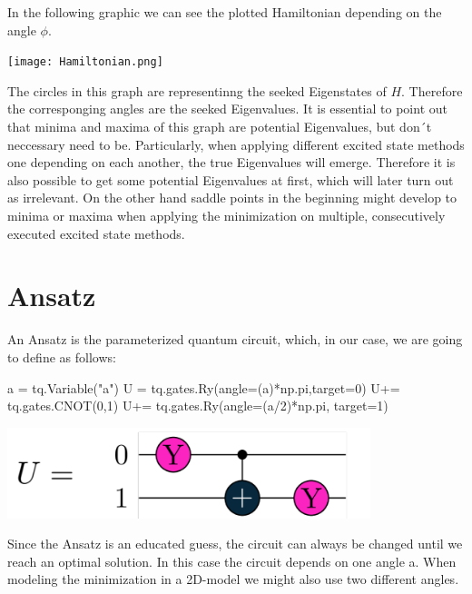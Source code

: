 \documentclass[
  letterpaper,
  DIV=11,
  numbers=noendperiod]{scrartcl}
\newenvironment{Shaded}{\begin{snugshade}}{\end{snugshade}}
\newcommand{\DecValTok}[1]{\textcolor[rgb]{0.68,0.00,0.00}{#1}}
\newcommand{\NormalTok}[1]{\textcolor[rgb]{0.00,0.23,0.31}{#1}}
\newcommand{\OperatorTok}[1]{\textcolor[rgb]{0.37,0.37,0.37}{#1}}
\newcommand{\StringTok}[1]{\textcolor[rgb]{0.13,0.47,0.30}{#1}}
\begin{document}
In the following graphic we can see the plotted Hamiltonian depending on
the angle \(\phi\).

\texttt{[image: Hamiltonian.png]}

The circles in this graph are representinng the seeked Eigenstates of
\(H\). Therefore the corresponging angles are the seeked Eigenvalues. It
is essential to point out that minima and maxima of this graph are
potential Eigenvalues, but don´t neccessary need to be. Particularly,
when applying different excited state methods one depending on each
another, the true Eigenvalues will emerge. Therefore it is also possible
to get some potential Eigenvalues at first, which will later turn out as
irrelevant. On the other hand saddle points in the beginning might
develop to minima or maxima when applying the minimization on multiple,
consecutively executed excited state methods.

\section{Ansatz}\label{ansatz}

An Ansatz is the parameterized quantum circuit, which, in our case, we
are going to define as follows:

\begin{Shaded}
\begin{Highlighting}[]
\NormalTok{a }\OperatorTok{=}\NormalTok{ tq.Variable(}\StringTok{"a"}\NormalTok{)}
\NormalTok{U }\OperatorTok{=}\NormalTok{ tq.gates.Ry(angle}\OperatorTok{=}\NormalTok{(a)}\OperatorTok{*}\NormalTok{np.pi,target}\OperatorTok{=}\DecValTok{0}\NormalTok{)}
\NormalTok{U}\OperatorTok{+=}\NormalTok{ tq.gates.CNOT(}\DecValTok{0}\NormalTok{,}\DecValTok{1}\NormalTok{)}
\NormalTok{U}\OperatorTok{+=}\NormalTok{ tq.gates.Ry(angle}\OperatorTok{=}\NormalTok{(a}\OperatorTok{/}\DecValTok{2}\NormalTok{)}\OperatorTok{*}\NormalTok{np.pi, target}\OperatorTok{=}\DecValTok{1}\NormalTok{)}
\end{Highlighting}
\end{Shaded}

\includegraphics[width=4.16667in,height=\textheight]{circuit.png}

Since the Ansatz is an educated guess, the circuit can always be changed
until we reach an optimal solution. In this case the circuit depends on
one angle a. When modeling the minimization in a 2D-model we might also
use two different angles.
\end{document}
